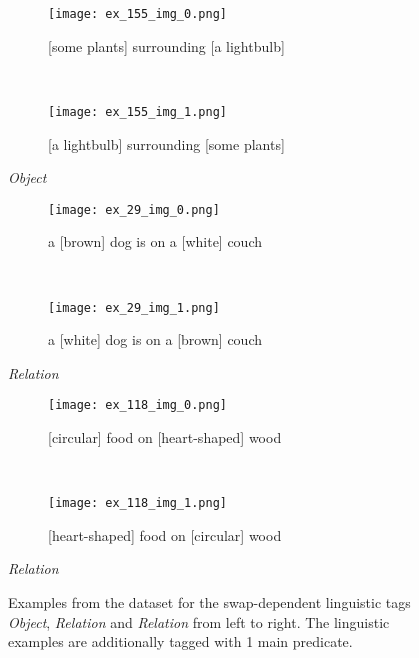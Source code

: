 \begin{figure}[ht]
\centering
    \begin{minipage}[t]{.30\textwidth}
        \begin{subfigure}[t]{\textwidth}
        \centering
        \texttt{[image: ex\_155\_img\_0.png]}
        \caption{[some plants] surrounding [a lightbulb]}
        \end{subfigure}\\
        \begin{subfigure}[t]{\textwidth}
        \centering
        \texttt{[image: ex\_155\_img\_1.png]}
        \caption{[a lightbulb] surrounding [some plants]}
        \end{subfigure}%
        \caption*{\textit{Object}}
    \end{minipage}
    \hfill
    \begin{minipage}[t]{.30\textwidth}
        \begin{subfigure}[t]{\textwidth}
        \centering
        \texttt{[image: ex\_29\_img\_0.png]}
        \caption{a [brown] dog is on a [white] couch}
        \end{subfigure}\\
        \vspace{9pt}
        \begin{subfigure}[t]{\textwidth}
        \centering
        \texttt{[image: ex\_29\_img\_1.png]}
        \caption{a [white] dog is on a [brown] couch}
        \end{subfigure}%
        \caption*{\textit{Relation}}
    \end{minipage}
    \hfill
    \begin{minipage}[t]{.30\textwidth}
        \begin{subfigure}[t]{\textwidth}
        \centering
        \texttt{[image: ex\_118\_img\_0.png]}
        \caption{[circular] food on [heart-shaped] wood}
        \end{subfigure}\\
        \begin{subfigure}[t]{\textwidth}
        \centering
        \texttt{[image: ex\_118\_img\_1.png]}
        \caption{[heart-shaped] food on [circular] wood}
        \end{subfigure}%
        \caption*{\textit{Relation}}
    \end{minipage}%
    \caption{Examples from the dataset for the swap-dependent linguistic tags \textit{Object}, \textit{Relation} and \textit{Relation} from left to right. The linguistic examples are additionally tagged with 1 main predicate.}
    \label{fig:dataset-examples}
\end{figure}

